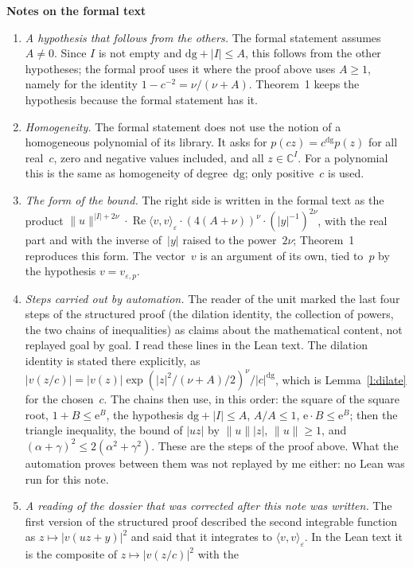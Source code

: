 \documentclass[11pt,a4paper]{article}
\newcommand{\m}[1]{\mbox{$#1$}}        %
\newcommand{\sect}[2]{\refstepcounter{section}\label{#2}\par\addvspace{19pt plus 4pt minus 2pt}\Needspace{7\baselineskip}%
  \noindent\llap{{\fontsize{13.2}{16}\selectfont\bfseries\color{inkfaint}\thesection}\hspace{9pt}}%
  {\fontsize{13.2}{16}\selectfont\bfseries\color{ink}#1}\par\nopagebreak\vspace{-1pt}}
\theoremstyle{plainx}
\theoremstyle{uprightx}
\newcommand{\CC}{\mathbb{C}}
\newcommand{\inn}[3]{\langle #2,#3\rangle_{#1}}        %
\newcommand{\pv}[2]{v_{#1,#2}}                         %
\newcommand{\opn}[1]{\lVert #1\rVert}                  %
\newcommand{\ee}{\mathrm{e}}
\newcommand{\dg}{\mathrm{dg}}                           %
\begin{document}
\sect{Notes on the formal text}{s:notes}
\begin{enumerate}[label=\textup{\arabic*.},leftmargin=1.6em,itemsep=5pt]
\item \emph{A hypothesis that follows from the others.} The formal statement assumes \m{A\ne0}. Since $I$ is not
empty and \m{\dg+|I|\le A}, this follows from the other hypotheses; the formal proof uses it where the
proof above uses \m{A\ge1}, namely for the identity \m{1-c^{-2}=\nu/(\nu+A)}. Theorem~1 keeps the hypothesis because
the formal statement has it.
\item \emph{Homogeneity.} The formal statement does not use the notion of a homogeneous polynomial of its
library. It asks for \m{p(cz)=c^{\dg}p(z)} for all real~$c$, zero and negative values included, and all
\m{z\in\CC^I}. For a polynomial this is the same as homogeneity of degree~$\dg$; only positive~$c$ is used.
\item \emph{The form of the bound.} The right side is written in the formal text as the product
\m{\opn{u}^{|I|+2\nu}\cdot\operatorname{Re}\inn{\varepsilon}{v}{v}\cdot(4(A+\nu))^{\nu}\cdot(|y|^{-1})^{2\nu}},
with the real part and with the inverse of~$|y|$ raised to the power~$2\nu$; Theorem~1 reproduces this form. The
vector~$v$ is an argument of its own, tied to~$p$ by the hypothesis \m{v=\pv{\varepsilon}{p}}.
\item \emph{Steps carried out by automation.} The reader of the unit marked the last four steps of the
structured proof (the dilation identity, the collection of powers, the two chains of inequalities) as claims
about the mathematical content, not replayed goal by goal. I read these lines in the Lean text. The dilation
identity is stated there explicitly, as
\m{|v(z/c)|=|v(z)|\exp(|z|^2/(\nu+A)/2)^{\nu}/|c|^{\dg}}, which is Lemma~\ref{l:dilate} for the chosen~$c$. The
chains then use, in this order: the square of the square root, \m{1+B\le\ee^{B}}, the hypothesis
\m{\dg+|I|\le A}, \m{A/A\le1}, \m{\ee\cdot B\le\ee^{B}}; then the triangle inequality, the bound of \m{|uz|} by
\m{\opn{u}|z|}, \m{\opn{u}\ge1}, and \m{(\alpha+\gamma)^2\le2(\alpha^2+\gamma^2)}. These are the steps of the proof
above. What the automation proves between them was not replayed by me either: no Lean was run for this note.
\item \emph{A reading of the dossier that was corrected after this note was written.} The first version of the
structured proof described the second integrable function as \m{z\mapsto|v(uz+y)|^2} and said that it integrates
to \m{\inn{\varepsilon}{v}{v}}. In the Lean text it is the composite of \m{z\mapsto|v(z/c)|^2} with the

\end{enumerate}
\end{document}
